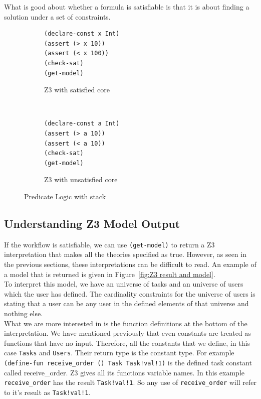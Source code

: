 \documentclass[a4paper]{report}
\begin{document}
What is good about whether a formula is satisfiable is that it is about finding a solution under a set of constraints. 
\begin{figure}[!htb]
\centering
\begin{subfigure}[b]{\textwidth}
\lstset{numbers=left, showspaces=false,
    showstringspaces=false, tabsize=2, breaklines=true,
    xleftmargin=5.0ex,
}
\lstset{basicstyle=\ttfamily}
\centering
\begin{lstlisting}[frame=single]
(declare-const x Int)
(assert (> x 10))
(assert (< x 100))
(check-sat)
(get-model)
\end{lstlisting}
\caption{Z3 with satisfied core}
\label{fig:Z3 with satisfied core}
\end{subfigure}\\
\begin{subfigure}[b]{\textwidth}
\lstset{numbers=left, showspaces=false,
    showstringspaces=false, tabsize=2, breaklines=true,
    xleftmargin=5.0ex,
}
\lstset{basicstyle=\ttfamily}
\begin{lstlisting}[frame=single]
(declare-const a Int)
(assert (> a 10))
(assert (< a 10))
(check-sat)
(get-model)
\end{lstlisting}
\caption{Z3 with unsatisfied core}
\label{fig:Z3 with unsatisfied core}
\end{subfigure}
\caption{Predicate Logic with stack}
\label{fig:Z3 cores}
\end{figure} 

\subsection{Understanding Z3 Model Output}
If the workflow is satisfiable, we can use \texttt{(get-model)} to return a Z3 interpretation that makes all the theories specified as true. However, as seen in the previous sections, these interpretations can be difficult to read. An example of a model that is returned is given in Figure~\ref{fig:Z3 result and model}. \\

To interpret this model, we have an universe of tasks and an universe of users which the user has defined. The cardinality constraints for the universe of users is stating that a user can be any user in the defined elements of that universe and nothing else. \\

What we are more interested in is the function definitions at the bottom of the interpretation. We have mentioned previously that even constants are treated as functions that have no input. Therefore, all the constants that we define, in this case \texttt{Tasks} and \texttt{Users}. Their return type is the constant type. For example \texttt{(define-fun receive\_order () Task Task!val!1)} is the defined task constant called receive\_order. Z3 gives all its functions variable names. In this example \texttt{receive\_order} has the result \texttt{Task!val!1}. So any use of \texttt{receive\_order} will refer to it's result as \texttt{Task!val!1}. \\
\end{document}
